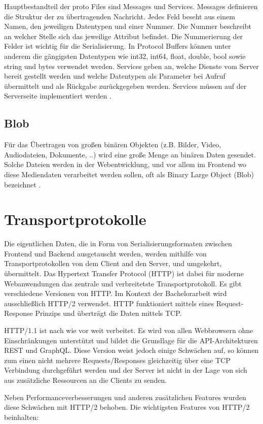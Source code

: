 Hauptbestandteil der proto Files sind Messages und Services.
Messages definieren die Struktur der zu übertragenden Nachricht. Jedes Feld beseht aus einem Namen, den jeweiligen Datentypen und einer Nummer. Die Nummer beschreibt an welcher Stelle sich das jeweilige Attribut befindet. Die Nummerierung der Felder ist wichtig für die Serialisierung. In Protocol Buffers können unter anderem die gängigsten Datentypen wie int32, int64, float, double, bool sowie string und bytes verwendet werden.
Services geben an, welche Dienste vom Server bereit gestellt werden und welche Datentypen als Parameter bei Aufruf übermittelt und als Rückgabe zurückgegeben werden. Services müssen auf der Serverseite implementiert werden \parencite{protobufdocs}.


\subsection{Blob}
Für das Übertragen von großen binären Objekten (z.B. Bilder, Video, Audiodateien, Dokumente, ..) wird eine große Menge an binären Daten gesendet. Solche Dateien werden in der Webentwicklung, und vor allem im Frontend wo diese Mediendaten verarbeitet werden sollen, oft als Binary Large Object (Blob) bezeichnet \parencite{w3c-fileapi}.

\section{Transportprotokolle}
Die eigentlichen Daten, die in Form von Serialisierungsformaten zwischen Frontend und Backend ausgetauscht werden, werden mithilfe von Transportprotokollen von dem Client and den Server, und umgekehrt, übermittelt. Das Hypertext Transfer Protocol (HTTP) ist dabei für moderne Webanwendungen das zentrale und verbreitetste Transportprotokoll. Es gibt verschiedene Versionen von HTTP. Im Kontext der Bachelorarbeit wird ausschließlich HTTP/2 verwendet. HTTP funktioniert mittels eines Request-Response Prinzips und überträgt die Daten mittels TCP.

HTTP/1.1 ist nach wie vor weit verbeitet. Es wird von allen Webbrowsern ohne Einschränkungen unterstützt und bildet die Grundlage für die API-Architekturen REST und GraphQL. Diese Version weist jedoch einige Schwächen auf, so können zum einen nicht mehrere Requests/Responses gleichzeitig über eine TCP Verbindung durchgeführt werden und der Server ist nicht in der Lage von sich aus zusätzliche Ressourcen an die Clients zu senden. 

Neben Performanceverbesserungen und anderen zusätzlichen Features wurden diese Schwächen mit HTTP/2 behoben.
Die wichtigsten Features von HTTP/2 beinhalten:

